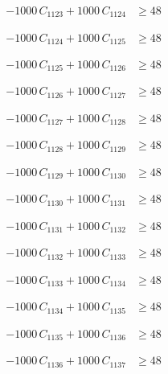 \documentclass[a4paper,11pt]{article}
\begin{document}
\begin{align}
-1000\,C_{1123} + 1000\,C_{1124} &\geq 48 \nonumber
\end{align}

\begin{align}
-1000\,C_{1124} + 1000\,C_{1125} &\geq 48 \nonumber
\end{align}

\begin{align}
-1000\,C_{1125} + 1000\,C_{1126} &\geq 48 \nonumber
\end{align}

\begin{align}
-1000\,C_{1126} + 1000\,C_{1127} &\geq 48 \nonumber
\end{align}

\begin{align}
-1000\,C_{1127} + 1000\,C_{1128} &\geq 48 \nonumber
\end{align}

\begin{align}
-1000\,C_{1128} + 1000\,C_{1129} &\geq 48 \nonumber
\end{align}

\begin{align}
-1000\,C_{1129} + 1000\,C_{1130} &\geq 48 \nonumber
\end{align}

\begin{align}
-1000\,C_{1130} + 1000\,C_{1131} &\geq 48 \nonumber
\end{align}

\begin{align}
-1000\,C_{1131} + 1000\,C_{1132} &\geq 48 \nonumber
\end{align}

\begin{align}
-1000\,C_{1132} + 1000\,C_{1133} &\geq 48 \nonumber
\end{align}

\begin{align}
-1000\,C_{1133} + 1000\,C_{1134} &\geq 48 \nonumber
\end{align}

\begin{align}
-1000\,C_{1134} + 1000\,C_{1135} &\geq 48 \nonumber
\end{align}

\begin{align}
-1000\,C_{1135} + 1000\,C_{1136} &\geq 48 \nonumber
\end{align}

\begin{align}
-1000\,C_{1136} + 1000\,C_{1137} &\geq 48 \nonumber
\end{align}
\end{document}
